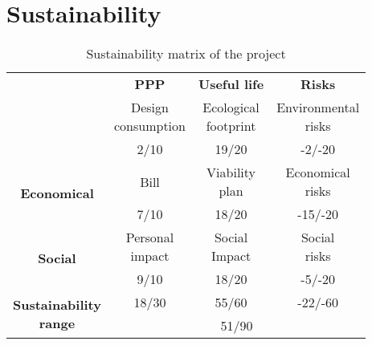 \section{Sustainability}
\begin{frame}{\insertsec}
  \begin{table}[H]
    \centering
    \begin{tabular}{|c|c|c|c|}
      \cline{2-4}
      \multicolumn{1}{c|}{} & \textbf{PPP} & \textbf{Useful life} & \textbf{Risks} \\ 
      \hhline{-===}
  
      \multirow[c]{2}{*}{\textbf{Environmental}} & 
      \makecell{Design \\ consumption} & \makecell{Ecological \\ footprint} & 
      \makecell{Environmental \\ risks} \\ \cline{2-4}
      & 2/10 & 19/20 & -2/-20 \\ \hline
      
      \multirow{2}{*}{\textbf{Economical}} & 
      Bill & \makecell{Viability \\ plan} & \makecell{Economical \\ risks} \\ \cline{2-4}
      & 7/10 & 18/20 & -15/-20 \\ \hline
  
      \multirow{2}{*}{\textbf{Social}} &
      \makecell{Personal \\ impact} & \makecell{Social \\ Impact} & 
      \makecell{Social \\ risks} \\ \cline{2-4} 
      & 9/10 & 18/20 & -5/-20 \\ \hline
  
      \hline\hline
      \multirow{2}{*}{\parbox[c]{3cm}{\centering\textbf{Sustainability \\ range}}} &
      18/30 & 55/60 & -22/-60 \\ \cline{2-4}
      & \multicolumn{3}{c|}{51/90} \\ \hline
  
    \end{tabular}
    \caption{Sustainability matrix of the project \label{tab:sustainability}}
  \end{table}  
\end{frame}
